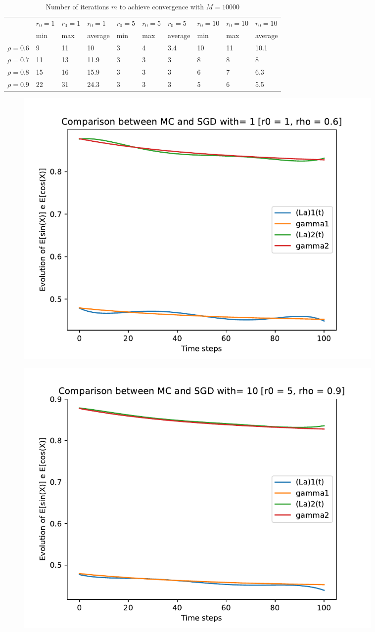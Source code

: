 \documentclass[a4paper,11pt,openright]{report}
\begin{document}
\begin{table}[H]
\centering
\addtolength{\leftskip}{-1.5cm}
\addtolength{\rightskip}{-1.5cm}
\begin{tabular}{|c|lllllllll|}
\hline
$ $ & $r_0 = 1$ & $r_0 = 1$ & $r_0 = 1$ & $r_0 = 5$ & $r_0 = 5$ & $r_0 = 5$ & $r_0 = 10$ & $r_0 = 10$ & $r_0 = 10$  \\
$ $ & min & max & average & min & max & average & min & max & average \\ 
\hline
$\rho = 0.6$ & 9 & 11 & 10 & 3 & 4 & 3.4 & 10 & 11 & 10.1 \\

$\rho = 0.7$ & 11 & 13 & 11.9 & 3 & 3 & 3 & 8 & 8 & 8\\

$\rho = 0.8$ & 15 & 16 & 15.9 & 3 & 3 & 3 & 6 & 7 & 6.3\\

$\rho = 0.9$ & 22 & 31 & 24.3 & 3 & 3 & 3 & 5 & 6 & 5.5\\
\hline
\end{tabular}
\caption{Number of iterations $m$ to achieve convergence with $M = 10000$}
\end{table}
\begin{figure}[H]
\centering
\includegraphics[width=0.9\textwidth]{images/graphs T = 1/n = 5, M = 1 sine and cosine.pdf}
\end{figure}
\begin{figure}[H]
\centering
\includegraphics[width=0.9\textwidth]{images/graphs T = 1/n = 5, M = 10 sine and cosine.pdf}
\end{figure}
\end{document}
